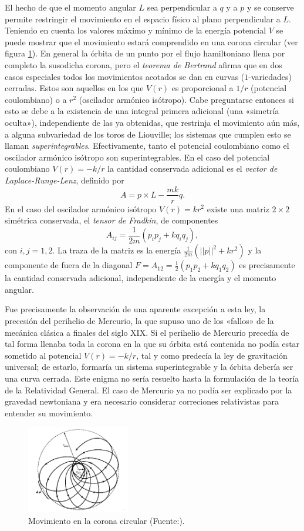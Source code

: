 El hecho de que el momento angular $L$ sea perpendicular a $q$ y a $p$ y se conserve permite restringir el movimiento en el espacio físico al plano perpendicular a $L$. Teniendo en cuenta los valores máximo y mínimo de la energía potencial $V$ se puede mostrar que el movimiento estará comprendido en una corona circular (ver figura \ref{fig:bertrand}). En general la órbita de un punto por el flujo hamiltoniano llena por completo la susodicha corona, pero el \emph{teorema de Bertrand} afirma que en dos casos especiales todos los movimientos acotados se dan en curvas ($1$-variedades) cerradas. Estos son aquellos en los que $V(r)$ es proporcional a $1/r$ (potencial coulombiano) o a $r^2$ (oscilador armónico isótropo). Cabe preguntarse entonces si esto se debe a la existencia de una integral primera adicional (una «simetría oculta»), independiente de las ya obtenidas, que restrinja el movimiento aún más, a alguna subvariedad de los toros de Liouville; los sistemas que cumplen esto se llaman \emph{superintegrables}. Efectivamente, tanto el potencial coulombiano como el oscilador armónico isótropo son superintegrables. En el caso del potencial coulombiano $V(r)=-k/r$ la cantidad conservada adicional es el \emph{vector de Laplace-Runge-Lenz}, definido por
\begin{equation*}
  A=p\times L - \frac{mk}{r}q.
\end{equation*}
En el caso del oscilador armónico isótropo $V(r)=kr^2$ existe una matriz $2\times 2$ simétrica conservada, el \emph{tensor de Fradkin}, de componentes
\begin{equation*}
  A_{ij}=\frac{1}{2m}(p_ip_j+kq_iq_j),
\end{equation*}
con $i,j=1,2$. La traza de la matriz es la energía $\tfrac{1}{2m}(||p||^2+kr^2)$ y la componente de fuera de la diagonal $F=A_{12}=\frac{1}{2}(p_1p_2+kq_1q_2)$ es precisamente la cantidad conservada adicional, independiente de la energía y el momento angular.

Fue precisamente la observación de una aparente excepción a esta ley, la precesión del perihelio de Mercurio, la que supuso uno de los «fallos» de la mecánica clásica a finales del siglo XIX. Si el perihelio de Mercurio precedía de tal forma llenaba toda la corona en la que su órbita está contenida no podía estar sometido al potencial $V(r)=-k/r$, tal y como predecía la ley de gravitación universal; de estarlo, formaría un sistema superintegrable y la órbita debería ser una curva cerrada. Este enigma no sería resuelto hasta la formulación de la teoría de la Relatividad General. El caso de Mercurio ya no podía ser explicado por la gravedad newtoniana y era necesario considerar correciones relativistas para entender su movimiento.

\begin{figure}[h]
  \centering
  \includegraphics[width=0.4\textwidth]{pics/bertrand}
  \caption{\small Movimiento en la corona circular (Fuente:\cite{landau}).}
  \label{fig:bertrand}
\end{figure}
